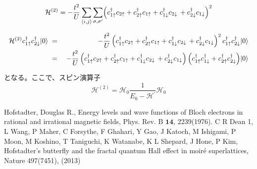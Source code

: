 \documentclass{jarticle}
\begin{document}
\begin{eqnarray*}
\mathcal{H}^{(2)}
=
-\frac{t^2}{U}
\sum_{\langle i,j\rangle}\sum_{\sigma,\sigma'}
\Bigl(
   c_{1\uparrow}^\dagger c_{2\uparrow}
 + c_{2\uparrow}^\dagger c_{1\uparrow}
 + c_{1\downarrow}^\dagger c_{2\downarrow}\,
 + c_{2\downarrow}^\dagger c_{1\downarrow}
\Bigr)^2
\end{eqnarray*}

\begin{eqnarray*}
  \mathcal{H}^{(2)}
c_{1\uparrow}^\dagger c_{2\downarrow}^\dagger\!\ket{0}
\;&=&\;
-\frac{t^2}{U}\,
\Bigl(
   c_{1\uparrow}^\dagger c_{2\uparrow}
 + c_{2\uparrow}^\dagger c_{1\uparrow}
 + c_{1\downarrow}^\dagger c_{2\downarrow}\,
 + c_{2\downarrow}^\dagger c_{1\downarrow}
\Bigr)^2\,
c_{1\uparrow}^\dagger c_{2\downarrow}^\dagger\!\ket{0}\\
\;&=&\;
-\frac{t^2}{U}\,
\Bigl(
   c_{1\uparrow}^\dagger c_{2\uparrow}
 + c_{2\uparrow}^\dagger c_{1\uparrow}
 + c_{1\downarrow}^\dagger c_{2\downarrow}\,
 + c_{2\downarrow}^\dagger c_{1\downarrow}
\Bigr)\,
\Bigl(c_{1\uparrow}^\dagger c_{1\downarrow}^\dagger+c_{2\uparrow}^\dagger c_{2\downarrow}^\dagger\Bigr)\!\ket{0}\\
\end{eqnarray*}

となる。ここで、スピン演算子
\begin{equation}
  \mathcal{H}^{(2)} = \mathcal{H}_0 \frac{1}{E_0 - \mathcal{H}^{'}}\mathcal{H}_0
  \label{spin}
\end{equation}

\begin{thebibliography}{9}
   Hofstadter, Douglas R., Energy levels and wave functions of Bloch electrons in rational and irrational magnetic fields, Phys. Rev. B $\bm{14}$, 2239(1976).
   C R Dean 1, L Wang, P Maher, C Forsythe, F Ghahari, Y Gao, J Katoch, M Ishigami, P Moon, M Koshino, T Taniguchi, K Watanabe, K L Shepard, J Hone, P Kim, Hofstadter's butterfly and the fractal quantum Hall effect in moiré superlattices, Nature 497(7451), (2013)
\end{thebibliography}
\end{document}
